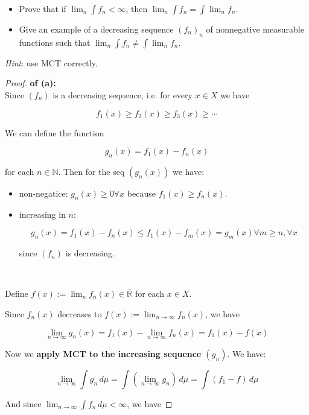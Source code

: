 \begin{itemize}
\item
  Prove that if \(\lim_{n}\int f_{n} < \infty\), then \(\lim_{n}\int f_{n} = \int\lim_{n}f_{n}\).
\item
  Give an example of a decreasing sequence \((f_{n})_{n}\) of nonnegative measurable functions such that \(\lim_{n}\int f_{n} \neq \int\lim_{n}f_{n}\).
\end{itemize}

\emph{Hint}: use MCT correctly.

\begin{proof}

\textbf{of (a):}\\
Since \((f_{n})\) is a decreasing sequence, i.e. for every \(x \in X\) we have

\[f_{1}(x) \geq f_{2}(x) \geq f_{3}(x) \geq \cdots\]

We can define the function

\[g_{n}(x) = f_{1}(x) - f_{n}(x)\]

for each \(n \in \mathbb{N}\). Then for the seq \((g_{n}(x))\) we have:

\begin{itemize}
\item
  non-negatice: \(g_{n}(x) \geq 0\forall x\) because \(f_{1}(x) \geq f_{n}(x)\).
\item
  increasing in \(n\):

  \[g_{n}(x) = f_{1}(x) - f_{n}(x) \leq f_{1}(x) - f_{m}(x) = g_{m}(x)\forall m \geq n,\forall x\]

  since \((f_{n})\) is decreasing.\\
  \strut \\
\end{itemize}

Define \(f(x) := \lim_{n}f_{n}(x) \in \bar{\mathbb{R}}\) for each \(x \in X\).

Since \(f_{n}(x)\) decreases to \(f(x) := \lim_{n\rightarrow\infty}f_{n}(x)\), we have

\[\lim\limits_{n\rightarrow\infty}g_{n}(x) = f_{1}(x) - \lim\limits_{n\rightarrow\infty}f_{n}(x) = f_{1}(x) - f(x)\]

Now we \textbf{apply MCT to the increasing sequence \((g_{n})\)}. We have:

\[\lim\limits_{n\rightarrow\infty}\int g_{n}\, d\mu = \int(\lim\limits_{n\rightarrow\infty}g_{n})\, d\mu = \int(f_{1} - f)\, d\mu\]

And since \(\lim_{n\rightarrow\infty}\int f_{n}\, d\mu < \infty\), we have


\end{proof}
